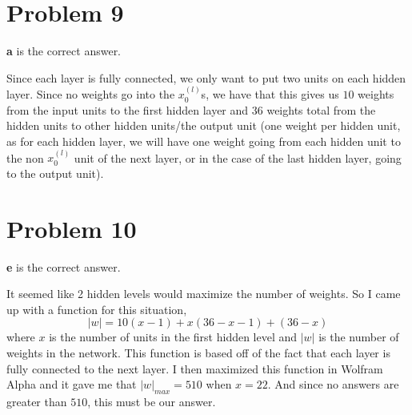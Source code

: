 \documentclass{article}
\begin{document}
\section*{Problem 9}
\textbf{a} is the correct answer.

\noindent Since each layer is fully connected, we only want to put two units
on each hidden layer. Since no weights go into the $x_0^{(l)}$s, we have that
this gives us $10$ weights from the input units to the first hidden layer and
$36$ weights total from the hidden units to other hidden units/the output unit
(one weight per hidden unit, as for each hidden layer, we will have one weight
going from each hidden unit to the non $x_0^{(l)}$ unit of the next layer, or
in the case of the last hidden layer, going to the output unit).

\section*{Problem 10}
\textbf{e} is the correct answer.

\noindent It seemed like 2 hidden levels would maximize the number of weights.
So I came up with a function for this situation,
\[ |w| = 10(x-1) + x(36-x-1) + (36-x) \]
where $x$ is the number of units in the first hidden level and $|w|$ is the
number of weights in the network. This function is based off of the fact that each
layer is fully connected to the next layer. I then maximized this function in
Wolfram Alpha and it gave me that $|w|_{max} = 510$ when $x=22$. And since no
answers are greater than $510$, this must be our answer.
\end{document}
